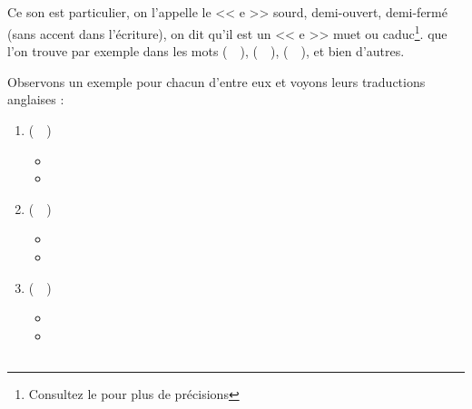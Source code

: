 \subsection{}\label{subsec:əfr}

Ce son est particulier, on l'appelle le << e >> sourd, demi-ouvert,
demi-fermé (sans accent dans l'écriture), on dit qu'il est un << e >>
muet ou caduc\footnote{Consultez le \GE pour plus de
  précisions}. 
que l'on trouve par exemple dans les mots
 (~~),  (~~),  (~~), et bien d'autres.

Observons un exemple pour chacun d'entre eux et voyons leurs
traductions anglaises :\par

\begin{enumerate}
\item {} (~~)
  \begin{itemize}
  \item {}
    \item {}
    \end{itemize}
    
\item {} (~~)
  \begin{itemize}
  \item {}
  \item {}
  \end{itemize}

  
\item {} (~~)
  \begin{itemize}
  \item {}
  \item {}
  \end{itemize}
   
\end{enumerate}

\subsection{}\label{subsec:ifr}

